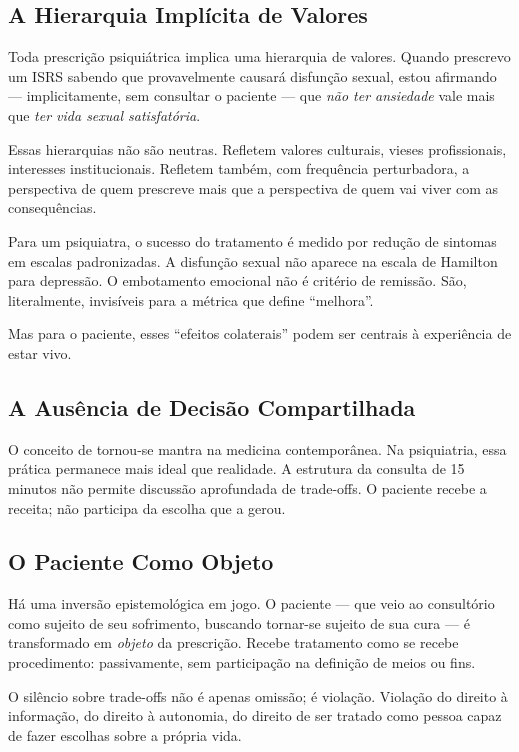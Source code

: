 \subsection{A Hierarquia Implícita de Valores}

Toda prescrição psiquiátrica implica uma hierarquia de valores. Quando prescrevo um ISRS sabendo que provavelmente causará disfunção sexual, estou afirmando --- implicitamente, sem consultar o paciente --- que \textit{não ter ansiedade} vale mais que \textit{ter vida sexual satisfatória}.

Essas hierarquias não são neutras. Refletem valores culturais, vieses profissionais, interesses institucionais. Refletem também, com frequência perturbadora, a perspectiva de quem prescreve mais que a perspectiva de quem vai viver com as consequências.

Para um psiquiatra, o sucesso do tratamento é medido por redução de sintomas em escalas padronizadas. A disfunção sexual não aparece na escala de Hamilton para depressão. O embotamento emocional não é critério de remissão. São, literalmente, invisíveis para a métrica que define \enquote{melhora}.

Mas para o paciente, esses \enquote{efeitos colaterais} podem ser centrais à experiência de estar vivo.

\subsection{A Ausência de Decisão Compartilhada}

O conceito de  tornou-se mantra na medicina contemporânea. Na psiquiatria, essa prática permanece mais ideal que realidade. A estrutura da consulta de 15 minutos não permite discussão aprofundada de trade-offs. O paciente recebe a receita; não participa da escolha que a gerou.

\subsection{O Paciente Como Objeto}

Há uma inversão epistemológica em jogo. O paciente --- que veio ao consultório como sujeito de seu sofrimento, buscando tornar-se sujeito de sua cura --- é transformado em \textit{objeto} da prescrição. Recebe tratamento como se recebe procedimento: passivamente, sem participação na definição de meios ou fins.

O silêncio sobre trade-offs não é apenas omissão; é violação. Violação do direito à informação, do direito à autonomia, do direito de ser tratado como pessoa capaz de fazer escolhas sobre a própria vida.

